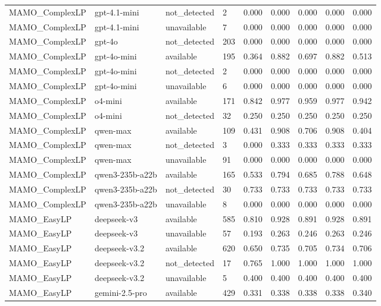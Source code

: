 \begin{table}[t]
\begin{tabular}{lllllllll}
MAMO\_ComplexLP & gpt-4.1-mini & not\_detected & 2 & 0.000 & 0.000 & 0.000 & 0.000 & 0.000 \\
MAMO\_ComplexLP & gpt-4.1-mini & unavailable & 7 & 0.000 & 0.000 & 0.000 & 0.000 & 0.000 \\
MAMO\_ComplexLP & gpt-4o & not\_detected & 203 & 0.000 & 0.000 & 0.000 & 0.000 & 0.000 \\
MAMO\_ComplexLP & gpt-4o-mini & available & 195 & 0.364 & 0.882 & 0.697 & 0.882 & 0.513 \\
MAMO\_ComplexLP & gpt-4o-mini & not\_detected & 2 & 0.000 & 0.000 & 0.000 & 0.000 & 0.000 \\
MAMO\_ComplexLP & gpt-4o-mini & unavailable & 6 & 0.000 & 0.000 & 0.000 & 0.000 & 0.000 \\
MAMO\_ComplexLP & o4-mini & available & 171 & 0.842 & 0.977 & 0.959 & 0.977 & 0.942 \\
MAMO\_ComplexLP & o4-mini & not\_detected & 32 & 0.250 & 0.250 & 0.250 & 0.250 & 0.250 \\
MAMO\_ComplexLP & qwen-max & available & 109 & 0.431 & 0.908 & 0.706 & 0.908 & 0.404 \\
MAMO\_ComplexLP & qwen-max & not\_detected & 3 & 0.000 & 0.333 & 0.333 & 0.333 & 0.333 \\
MAMO\_ComplexLP & qwen-max & unavailable & 91 & 0.000 & 0.000 & 0.000 & 0.000 & 0.000 \\
MAMO\_ComplexLP & qwen3-235b-a22b & available & 165 & 0.533 & 0.794 & 0.685 & 0.788 & 0.648 \\
MAMO\_ComplexLP & qwen3-235b-a22b & not\_detected & 30 & 0.733 & 0.733 & 0.733 & 0.733 & 0.733 \\
MAMO\_ComplexLP & qwen3-235b-a22b & unavailable & 8 & 0.000 & 0.000 & 0.000 & 0.000 & 0.000 \\
MAMO\_EasyLP & deepseek-v3 & available & 585 & 0.810 & 0.928 & 0.891 & 0.928 & 0.891 \\
MAMO\_EasyLP & deepseek-v3 & unavailable & 57 & 0.193 & 0.263 & 0.246 & 0.263 & 0.246 \\
MAMO\_EasyLP & deepseek-v3.2 & available & 620 & 0.650 & 0.735 & 0.705 & 0.734 & 0.706 \\
MAMO\_EasyLP & deepseek-v3.2 & not\_detected & 17 & 0.765 & 1.000 & 1.000 & 1.000 & 1.000 \\
MAMO\_EasyLP & deepseek-v3.2 & unavailable & 5 & 0.400 & 0.400 & 0.400 & 0.400 & 0.400 \\
MAMO\_EasyLP & gemini-2.5-pro & available & 429 & 0.331 & 0.338 & 0.338 & 0.338 & 0.340 \\

\end{tabular}
\end{table}
